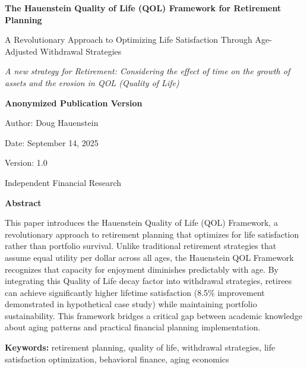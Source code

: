 \documentclass[12pt,a4paper]{article}
\begin{document}
\begin{titlepage}
\centering
{\LARGE\bfseries The Hauenstein Quality of Life (QOL) Framework for Retirement Planning\par}
\vspace{0.5cm}
{\Large A Revolutionary Approach to Optimizing Life Satisfaction Through Age-Adjusted Withdrawal Strategies\par}
\vspace{0.5cm}
{\large\textit{A new strategy for Retirement: Considering the effect of time on the growth of assets and the erosion in QOL (Quality of Life)}\par}
\vspace{1cm}
{\large\textbf{Anonymized Publication Version}\par}
\vspace{2cm}
{\large Author: Doug Hauenstein\par}
\vspace{1cm}
{\large Date: September 14, 2025\par}
\vspace{1cm}
{\large Version: 1.0\par}
\vfill
{\large Independent Financial Research\par}
\end{titlepage}

\newpage
\begin{center}
{\Large\bfseries Abstract}
\end{center}
\vspace{0.5cm}

This paper introduces the Hauenstein Quality of Life (QOL) Framework, a revolutionary approach to retirement planning that optimizes for life satisfaction rather than portfolio survival. Unlike traditional retirement strategies that assume equal utility per dollar across all ages, the Hauenstein QOL Framework recognizes that capacity for enjoyment diminishes predictably with age. By integrating this Quality of Life decay factor into withdrawal strategies, retirees can achieve significantly higher lifetime satisfaction (8.5\% improvement demonstrated in hypothetical case study) while maintaining portfolio sustainability. This framework bridges a critical gap between academic knowledge about aging patterns and practical financial planning implementation.

\textbf{Keywords:} retirement planning, quality of life, withdrawal strategies, life satisfaction optimization, behavioral finance, aging economics
\end{document}
